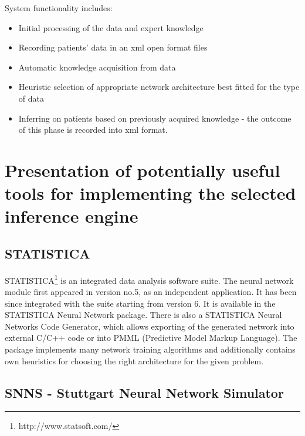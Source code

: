 \documentclass[10pt,oneside]{memoir}
\begin{document}
System functionality includes:


\begin{itemize}


\item Initial processing of the data and expert knowledge

\item Recording patients' data in an xml open format files

\item Automatic knowledge acquisition from data

\item Heuristic selection of appropriate network architecture best fitted for the type of data

\item Inferring on patients based on previously acquired knowledge - the outcome of this phase is recorded into xml format.
\end{itemize}

\chapter{Presentation of potentially useful tools for implementing the selected inference engine}
\label{presentationofpotentiallyusefultoolsforimplementingtheselectedinferenceengine}

\section{STATISTICA}
\label{statistica}

STATISTICA\footnote{http://www.statsoft.com/} is an integrated data analysis software suite. The neural network module first appeared in version no.5, as an independent application. It has been since integrated with the suite starting from version 6. It is available in the STATISTICA Neural Network package. There is also a STATISTICA Neural Networks Code Generator, which allows exporting of the generated network into external C/C++ code or into PMML (Predictive Model Markup Language). The package implements many network training algorithms and additionally contains own heuristics for choosing the right architecture for the given problem.


\section{SNNS - Stuttgart Neural Network Simulator}
\label{snns-stuttgartneuralnetworksimulator}
\end{document}
